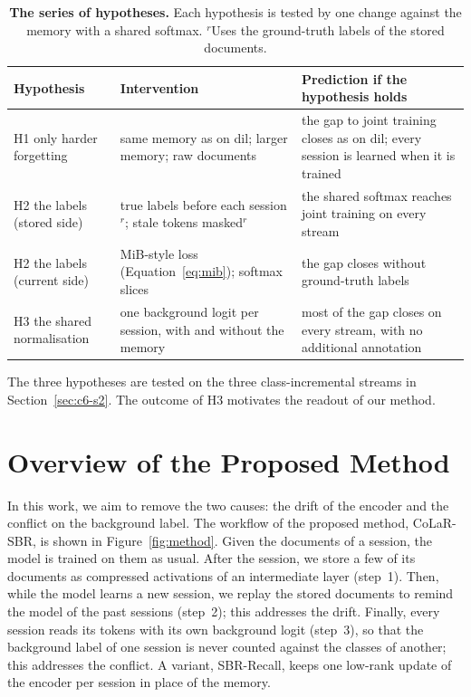 \begin{table}[!htbp]
  \centering
  \caption[The series of hypotheses and their tests]{\textbf{The series of hypotheses.}
  Each hypothesis is tested by one change against the memory with a shared softmax.
  $^{r}$Uses the ground-truth labels of the stored documents.}
  \label{tab:hypotheses}
  \begin{tabularx}{\textwidth}{@{}l>{\raggedright\arraybackslash}p{4.3cm}L@{}}
    \toprule
    Hypothesis & Intervention & Prediction if the hypothesis holds \\
    \midrule
    H1 only harder forgetting & same memory as on \gls{dil}; larger memory; raw documents &
      the gap to joint training closes as on \gls{dil}; every session is learned when it is trained \\
    \addlinespace
    H2 the labels (stored side) & true labels before each session$^{r}$; stale tokens masked$^{r}$ &
      the shared softmax reaches joint training on every stream \\
    H2 the labels (current side) & MiB-style loss (Equation~\ref{eq:mib}); softmax slices &
      the gap closes without ground-truth labels \\
    \addlinespace
    H3 the shared normalisation & one background logit per session, with and without the memory &
      most of the gap closes on every stream, with no additional annotation \\
    \bottomrule
  \end{tabularx}
\end{table}

\noindent The three hypotheses are tested on the three class-incremental streams in
Section~\ref{sec:c6-s2}. The outcome of H3 motivates the readout of our method.

\section{Overview of the Proposed Method}
\label{sec:m-overview}

In this work, we aim to remove the two causes: the drift of the encoder and the conflict on
the background label. The workflow of the proposed method, CoLaR-SBR, is shown in
Figure~\ref{fig:method}. Given the documents of a session, the model is trained on them as
usual. After the session, we store a few of its documents as compressed activations of an
intermediate layer (step~1). Then, while the model learns a new session, we replay the
stored documents to remind the model of the past sessions (step~2); this addresses the
drift. Finally, every session reads its tokens with its own background logit (step~3), so
that the background label of one session is never counted against the classes of another;
this addresses the conflict. A variant, SBR-Recall, keeps one low-rank update of the encoder
per session in place of the memory.

